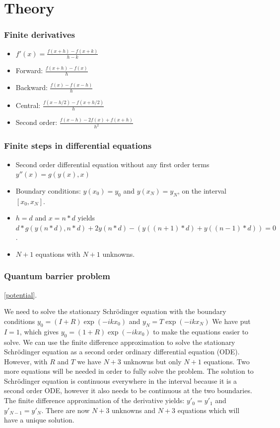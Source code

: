 \documentclass[•]{beamer}
\theoremstyle{remark}
\begin{document}
\section{Theory}

\begin{frame}\frametitle{Finite derivatives}
\begin{block}

\begin{itemize}
\item $f'(x) =\frac{f(x+h)-f(x+k)}{h-k}$
\pause
\item Forward: $\frac{f(x+h)-f(x)}{h}$
\pause
\item Backward: $\frac{f(x)-f(x-h)}{h}$
\pause
\item Central: $\frac{f(x-h/2)-f(x+h/2)}{h}$
\pause
\item Second order: $\frac{f(x-h)- 2f(x) +f(x+h)}{h^2}$
\end{itemize}
\end{block}
\end{frame}

\begin{frame}\frametitle{Finite steps in differential equations}
\begin{itemize}
\item Second order differential equation without any first order terms $y''(x) = g(y(x),x)$
\item Boundary conditions: $y(x_{0}) = y_{0}$ and $y(x_{N}) = y_{N}$, on the interval $[x_{0},x_{N}]$.
\item $h = d$ and $x = n*d$  yields $d*g(y(n*d),n*d) + 2y(n*d)-(y((n+1)*d)+y((n-1)*d)) = 0$.
\item  $N+1$ equations with $N+1$ unknowns.
\end{itemize}
\end{frame}

\begin{frame}\frametitle{Quantum barrier problem}
\begin{block}

\eqref{potential}. %

We need to solve the stationary Schr\"odinger equation with the boundary conditions
$y_{0} = (I + R)\exp{(-i k x_{0})}$ and $y_{N} = T\exp{(-i k x_{N})}$
We have put $I=1$, which gives $y_{0} = (1 + R)\exp{(-i k x_{0})}$ to make the equations easier to solve.
\pause
We can use the finite difference approximation to solve the stationary Schr\"odinger equation as a second order ordinary differential equation (ODE).
However, with $R$ and $T$ we have $N+3$ unknowns but only $N+1$ equations. Two more equations will be needed in order to fully solve the problem.
\pause
The solution to Schr\"odinger equation is continuous everywhere in the interval because it is a second order ODE,
however it also needs to be continuous at the two boundaries.
The finite difference approximation of the derivative yields: $y'_{0}=y'_{1}$ and $y'_{N-1}=y'_{N}$.
There are now $N+3$ unknowns and $N+3$ equations which will have a unique solution.
\end{block}
\end{frame}
\end{document}
